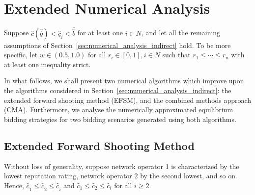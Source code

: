 \section{Extended Numerical Analysis} %
\label{sec:extended_numerical_analysis_indirect}
Suppose $\hat{c}(\underline{\hat{b}}) < \underline{\hat{c}}_i < \bar{\hat{b}}$ for at least one $i\in N$, and let all the remaining assumptions of Section~\ref{sec:numerical_analysis_indirect} hold. To be more specific, let $w\in (0.5,1.0)$ for all $r_i\in[0,1], i\in N$ such that $r_1\leq\cdots\leq r_n$ with at least one inequality strict.

In what follows, we shall present two numerical algorithms which improve upon the algorithms considered in Section~\ref{sec:numerical_analysis_indirect}: the extended forward shooting method (EFSM), and the combined methods approach (CMA). Furthermore, we analyse the numerically approximated equilibrium bidding strategies for two bidding scenarios generated using both algorithms.

\subsection{Extended Forward Shooting Method} %
\label{sub:extended_forward_shooting_method_indirect}
Without loss of generality, suppose network operator 1 is characterized by the lowest reputation rating, network operator 2 by the second lowest, and so on. Hence, $\underline{\hat{c}}_1\leq \underline{\hat{c}}_2\leq \underline{\hat{c}}_i$ and $\bar{\hat{c}}_1\leq \bar{\hat{c}}_2\leq \bar{\hat{c}}_i$ for all $i\geq 2$.

